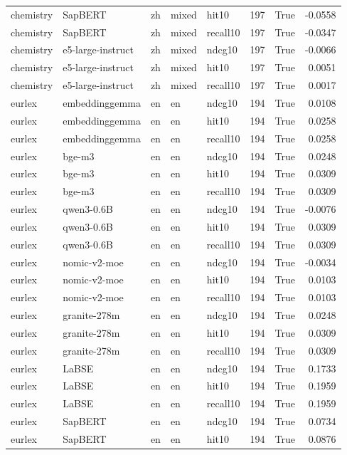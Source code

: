 \begin{tabular}{lllllrrr}
chemistry & SapBERT & zh & mixed & hit10 & 197 & True & -0.0558 \\
chemistry & SapBERT & zh & mixed & recall10 & 197 & True & -0.0347 \\
chemistry & e5-large-instruct & zh & mixed & ndcg10 & 197 & True & -0.0066 \\
chemistry & e5-large-instruct & zh & mixed & hit10 & 197 & True & 0.0051 \\
chemistry & e5-large-instruct & zh & mixed & recall10 & 197 & True & 0.0017 \\
eurlex & embeddinggemma & en & en & ndcg10 & 194 & True & 0.0108 \\
eurlex & embeddinggemma & en & en & hit10 & 194 & True & 0.0258 \\
eurlex & embeddinggemma & en & en & recall10 & 194 & True & 0.0258 \\
eurlex & bge-m3 & en & en & ndcg10 & 194 & True & 0.0248 \\
eurlex & bge-m3 & en & en & hit10 & 194 & True & 0.0309 \\
eurlex & bge-m3 & en & en & recall10 & 194 & True & 0.0309 \\
eurlex & qwen3-0.6B & en & en & ndcg10 & 194 & True & -0.0076 \\
eurlex & qwen3-0.6B & en & en & hit10 & 194 & True & 0.0309 \\
eurlex & qwen3-0.6B & en & en & recall10 & 194 & True & 0.0309 \\
eurlex & nomic-v2-moe & en & en & ndcg10 & 194 & True & -0.0034 \\
eurlex & nomic-v2-moe & en & en & hit10 & 194 & True & 0.0103 \\
eurlex & nomic-v2-moe & en & en & recall10 & 194 & True & 0.0103 \\
eurlex & granite-278m & en & en & ndcg10 & 194 & True & 0.0248 \\
eurlex & granite-278m & en & en & hit10 & 194 & True & 0.0309 \\
eurlex & granite-278m & en & en & recall10 & 194 & True & 0.0309 \\
eurlex & LaBSE & en & en & ndcg10 & 194 & True & 0.1733 \\
eurlex & LaBSE & en & en & hit10 & 194 & True & 0.1959 \\
eurlex & LaBSE & en & en & recall10 & 194 & True & 0.1959 \\
eurlex & SapBERT & en & en & ndcg10 & 194 & True & 0.0734 \\
eurlex & SapBERT & en & en & hit10 & 194 & True & 0.0876 \\

\end{tabular}
